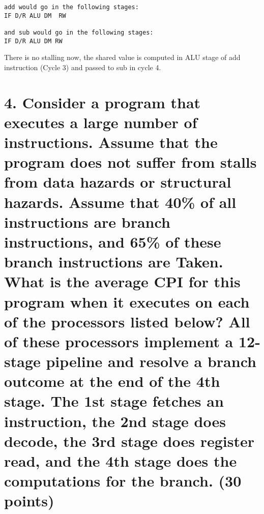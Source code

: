 \documentclass[11pt]{article}
\begin{document}
\begin{verbatim}
add would go in the following stages:
IF D/R ALU DM  RW
    
and sub would go in the following stages:
IF D/R ALU DM RW
\end{verbatim}
There is no stalling now, the shared value is computed in ALU stage of add instruction (Cycle 3) and passed to sub in cycle 4.

\newpage

\section*{4. Consider a program that executes a large number of instructions. Assume that the program does not suffer from stalls from data hazards or structural hazards. Assume that 40\% of all instructions are branch instructions, and 65\% of these branch instructions are Taken.  \\ What is the average CPI for this program when it executes on each of the processors listed below? All of these processors implement a 12-stage pipeline and resolve a branch outcome at the end of the 4th stage. The 1st stage fetches an instruction, the 2nd stage does decode, the 3rd stage does register read, and the 4th stage does the computations for the branch. (30 points)}
\end{document}
